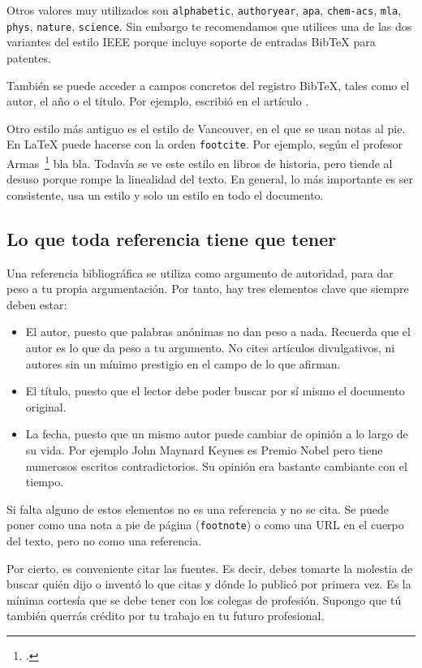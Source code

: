 Otros valores muy utilizados son \texttt{alphabetic}, \texttt{authoryear}, \texttt{apa}, \texttt{chem-acs}, \texttt{mla}, \texttt{phys}, \texttt{nature}, \texttt{science}.  Sin embargo te recomendamos que utilices una de las dos variantes del estilo IEEE porque incluye soporte de entradas BibTeX para patentes.

También se puede acceder a campos concretos del registro BibTeX, tales como el autor, el año o el título.  Por ejemplo, \citeauthor{armas2011estimation} escribió en \citeyear{armas2011estimation} el artículo .

Otro estilo más antiguo es el estilo de Vancouver, en el que se usan notas al pie.  En \LaTeX{} puede hacerse con la orden \texttt{footcite}.  Por ejemplo, según el profesor Armas~\footcite[3]{armas2011estimation} bla bla.  Todavía se ve este estilo en libros de historia, pero tiende al desuso porque rompe la linealidad del texto. En general, lo más importante es ser consistente, usa un estilo y solo un estilo en todo el documento.

\subsection{Lo que toda referencia tiene que tener}

Una referencia bibliográfica se utiliza como argumento de autoridad, para dar peso a tu propia argumentación.  Por tanto, hay tres elementos clave que siempre deben estar: 
\begin{itemize}
    \item El autor, puesto que palabras anónimas no dan peso a nada.  Recuerda que el autor es lo que da peso a tu argumento.  No cites artículos divulgativos, ni autores sin un mínimo prestigio en el campo de lo que afirman.
    \item El título, puesto que el lector debe poder buscar por sí mismo el documento original.
    \item La fecha, puesto que un mismo autor puede cambiar de opinión a lo largo de su vida.  Por ejemplo  John Maynard Keynes es Premio Nobel pero tiene numerosos escritos contradictorios.  Su opinión era bastante cambiante con el tiempo.
\end{itemize}

Si falta alguno de estos elementos no es una referencia y no se cita.  Se puede poner como una nota a pie de página (\texttt{footnote}) o como una URL en el cuerpo del texto, pero no como una referencia.

Por cierto, es conveniente citar las fuentes.  Es decir, debes tomarte la molestia de buscar quién dijo o inventó lo que citas y dónde lo publicó por primera vez.  Es la mínima cortesía que se debe tener con los colegas de profesión.  Supongo que tú también querrás crédito por tu trabajo en tu futuro profesional.
